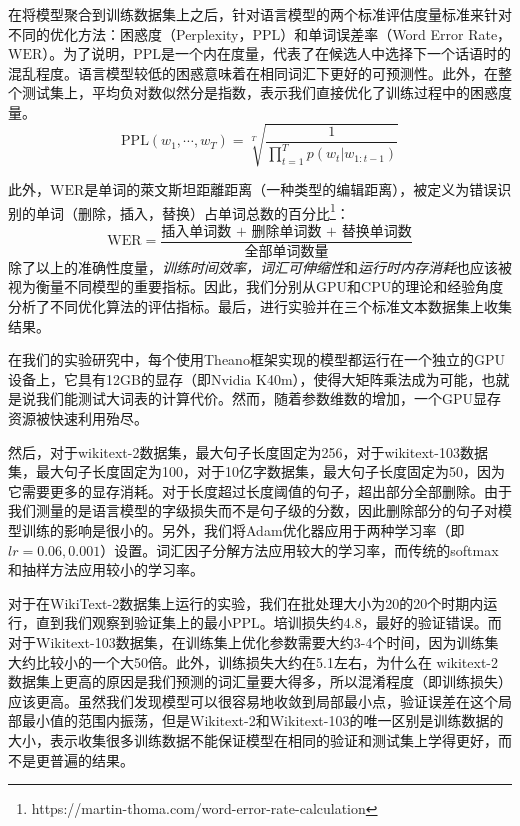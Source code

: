 在将模型聚合到训练数据集上之后，针对语言模型的两个标准评估度量标准来针对不同的优化方法：困惑度（Perplexity，$ \mathrm{PPL} $）和单词误差率（Word Error Rate，$\mathrm{WER} $）。为了说明，$ \mathrm{PPL} $是一个内在度量，代表了在候选人中选择下一个话语时的混乱程度。语言模型较低的困惑意味着在相同词汇下更好的可预测性。此外，在整个测试集上，平均负对数似然分是指数，表示我们直接优化了训练过程中的困惑度量。
\begin{equation}\label{equ:ppl}
   \mathrm{PPL}(w_1,\cdots,w_T)=\sqrt[T]{\frac{1}{\prod_{t=1}^T p(w_t|w_{1:t-1})}}
\end{equation}

此外，$\mathrm{WER}$是单词的萊文斯坦距離距离（一种类型的编辑距离），被定义为错误识别的单词（删除，插入，替换）占单词总数的百分比\footnote{https://martin-thoma.com/word-error-rate-calculation}：
\begin{equation}\label{equ:wer}
  \mathrm{WER} = \frac{\text{插入单词数 + 删除单词数 + 替换单词数}}{\text{全部单词数量}}
\end{equation}
除了以上的准确性度量，\textit{训练时间效率，词汇可伸缩性}和\textit{运行时内存消耗}也应该被视为衡量不同模型的重要指标。因此，我们分别从GPU和CPU的理论和经验角度分析了不同优化算法的评估指标。最后，进行实验并在三个标准文本数据集上收集结果。

在我们的实验研究中，每个使用Theano框架实现的模型都运行在一个独立的GPU设备上，它具有12GB的显存（即Nvidia K40m），使得大矩阵乘法成为可能，也就是说我们能测试大词表的计算代价。然而，随着参数维数的增加，一个GPU显存资源被快速利用殆尽。

然后，对于wikitext-2数据集，最大句子长度固定为256，对于wikitext-103数据集，最大句子长度固定为100，对于10亿字数据集，最大句子长度固定为50，因为它需要更多的显存消耗。对于长度超过长度阈值的句子，超出部分全部删除。由于我们测量的是语言模型的字级损失而不是句子级的分数，因此删除部分的句子对模型训练的影响是很小的。另外，我们将Adam优化器应用于两种学习率（即$ lr = 0.06,0.001 $）设置。词汇因子分解方法应用较大的学习率，而传统的softmax和抽样方法应用较小的学习率。

对于在WikiText-2数据集上运行的实验，我们在批处理大小为20的20个时期内运行，直到我们观察到验证集上的最小$ \mathrm{PPL} $。培训损失约4.8，最好的验证错误。而对于Wikitext-103数据集，在训练集上优化参数需要大约3-4个时间，因为训练集大约比较小的一个大50倍。此外，训练损失大约在5.1左右，为什么在 wikitext-2 数据集上更高的原因是我们预测的词汇量要大得多，所以混淆程度（即训练损失）应该更高。虽然我们发现模型可以很容易地收敛到局部最小点，验证误差在这个局部最小值的范围内振荡，但是Wikitext-2和Wikitext-103的唯一区别是训练数据的大小，表示收集很多训练数据不能保证模型在相同的验证和测试集上学得更好，而不是更普遍的结果。

